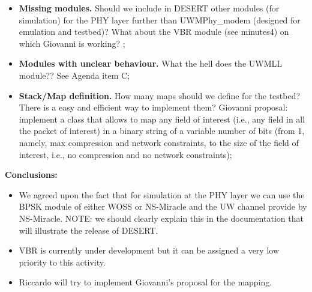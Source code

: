 \documentclass[11pt,journal,draftclsnofoot,onecolumn,twoside,letterpaper]{IEEEtran}
\theoremstyle{definition} \newtheorem{definition}[]{Definition}
\theoremstyle{theorem} \newtheorem{theorem}[]{Theorem}
\begin{document}
\begin{itemize}
 \item {\bf Missing modules.} Should we include in DESERT other modules (for simulation) for the PHY layer further than UWMPhy\_modem (designed for emulation and testbed)? What about the VBR module (see minutes4) on which Giovanni is working?  ;
 \item {\bf Modules with unclear behaviour.} What the hell does the UWMLL module?? See Agenda item C;
 \item {\bf Stack/Map definition.} How many maps should we define for the testbed? There is a easy and efficient way to implement them? Giovanni proposal: implement a class that allows to map any field of interest (i.e., any field in all the packet of interest) in a binary string of a variable number of bits (from 1, namely, max compression and network constraints, to the size of the field of interest, i.e., no compression and no network constraints);
\end{itemize}
{\bf Conclusions:} 
\begin{itemize}
 \item We agreed upon the fact that for simulation at the PHY layer we can use the BPSK module of either WOSS or NS-Miracle and the UW channel provide by NS-Miracle. NOTE: we should clearly explain this in the documentation that will illustrate the release of DESERT.
 \item VBR is currently under development but it can be assigned a very low priority to this activity.
 \item Riccardo will try to implement Giovanni's proposal for the mapping.
\end{itemize}
\end{document}
